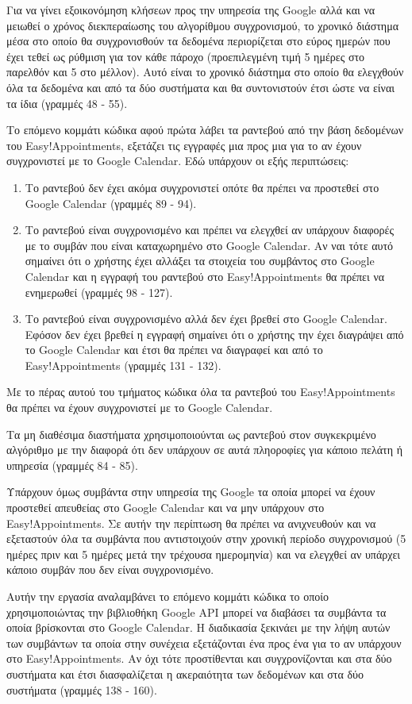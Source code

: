 Για να γίνει εξοικονόμηση κλήσεων προς την υπηρεσία της Google αλλά και να μειωθεί ο χρόνος διεκπεραίωσης του αλγορίθμου συγχρονισμού, το χρονικό διάστημα μέσα στο οποίο θα συγχρονισθούν τα δεδομένα περιορίζεται στο εύρος ημερών που έχει τεθεί ως ρύθμιση για τον κάθε πάροχο (προεπιλεγμένη τιμή 5 ημέρες στο παρελθόν και 5 στο μέλλον). Αυτό είναι το χρονικό διάστημα στο οποίο θα ελεγχθούν όλα τα δεδομένα και από τα δύο συστήματα και θα συντονιστούν έτσι ώστε να είναι τα ίδια (γραμμές 48 - 55).

Το επόμενο κομμάτι κώδικα αφού πρώτα λάβει τα ραντεβού από την βάση δεδομένων του Easy!Appointments, εξετάζει τις εγγραφές μια προς μια για το αν έχουν συγχρονιστεί με το Google Calendar. Εδώ υπάρχουν οι εξής περιπτώσεις:
\begin{enumerate}
\item Το ραντεβού δεν έχει ακόμα συγχρονιστεί οπότε θα πρέπει να προστεθεί στο Google Calendar (γραμμές 89 - 94).
\item Το ραντεβού είναι συγχρονισμένο και πρέπει να ελεγχθεί αν υπάρχουν διαφορές με το συμβάν που είναι καταχωρημένο στο Google Calendar. Αν ναι τότε αυτό σημαίνει ότι ο χρήστης έχει αλλάξει τα στοιχεία του συμβάντος στο Google Calendar και η εγγραφή του ραντεβού στο Easy!Appointments θα πρέπει να ενημερωθεί (γραμμές 98 - 127).
\item Το ραντεβού είναι συγχρονισμένο αλλά δεν έχει βρεθεί στο Google Calendar. Εφόσον δεν έχει βρεθεί η εγγραφή σημαίνει ότι ο χρήστης την έχει διαγράψει από το Google Calendar και έτσι θα πρέπει να διαγραφεί και από το Easy!Appointments (γραμμές 131 - 132).
\end{enumerate}
Με το πέρας αυτού του τμήματος κώδικα όλα τα ραντεβού του Easy!Appointments θα πρέπει να έχουν συγχρονιστεί με το Google Calendar.

Τα μη διαθέσιμα διαστήματα χρησιμοποιούνται ως ραντεβού στον συγκεκριμένο αλγόριθμο με την διαφορά ότι δεν υπάρχουν σε αυτά πληοροφίες για κάποιο πελάτη ή υπηρεσία (γραμμές 84 - 85).

Υπάρχουν όμως συμβάντα στην υπηρεσία της Google τα οποία μπορεί να έχουν προστεθεί απευθείας στο Google Calendar και να μην υπάρχουν στο Easy!Appointments. Σε αυτήν την περίπτωση θα πρέπει να ανιχνευθούν και να εξεταστούν όλα τα συμβάντα που αντιστοιχούν στην χρονική περίοδο συγχρονισμού (5 ημέρες πριν και 5 ημέρες μετά την τρέχουσα ημερομηνία) και να ελεγχθεί αν υπάρχει κάποιο συμβάν που δεν είναι συγχρονισμένο. 

Αυτήν την εργασία αναλαμβάνει το επόμενο κομμάτι κώδικα το οποίο χρησιμοποιώντας την βιβλιοθήκη Google API μπορεί να διαβάσει τα συμβάντα τα οποία βρίσκονται στο Google Calendar. Η διαδικασία ξεκινάει με την λήψη αυτών των συμβάντων τα οποία στην συνέχεια εξετάζονται ένα προς ένα για το αν υπάρχουν στο Easy!Appointments. Αν όχι τότε προστίθενται και συγχρονίζονται και στα δύο συστήματα και έτσι διασφαλίζεται η ακεραιότητα των δεδομένων και στα δύο συστήματα (γραμμές 138 - 160). 

